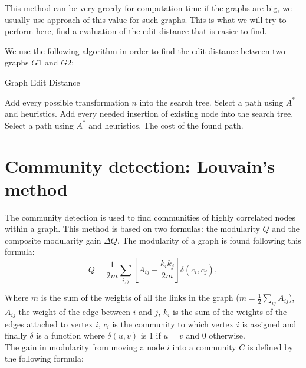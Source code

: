 \documentclass[UTF8, twoside]{EPURapport}
\begin{document}
	This method can be very greedy for computation time if the graphs are big, we usually use approach of this value for such graphs. This is what we will try to perform here, find a evaluation of the edit distance that is easier to find.

	We use the following algorithm in order to find the edit distance between two graphs $G1$ and $G2$:
	
\begin{algorithm}
  \caption{Graph Edit Distance}
  \begin{algorithmic}[1]
      \Repeat
		  \State Add every possible transformation $n$ into the search tree.
		  \State Select a path using $A^*$ and heuristics.
		\EndFor
		  \State Add every needed insertion of existing node into the search tree.
		  \State Select a path using $A^*$ and heuristics.
		\EndFor
	  \State \Return The cost of the found path.
  \end{algorithmic}
\end{algorithm}

\chapter{Community detection: Louvain's method}

	\hspace{4ex}The community detection is used to find communities of highly correlated nodes within a graph. This method is based on two formulas: the modularity $Q$ and the composite modularity gain $\Delta Q$. The modularity of a graph is found following this formula:
\\

\[
Q = \frac{1}{2m}\underset{i,j}{\sum}\left[A_{ij} - \frac{k_ik_j}{2m}\right] \delta(c_i,c_j),
\]

	Where $m$ is the sum of the weights of all the links in the graph ($m = \frac{1}{2}\underset{ij}{\sum}A_{ij}$), $A_{ij}$ the weight of the edge between $i$ and $j$, $k_i$ is the sum of the weights of the edges attached to vertex $i$, $c_i$ is the community to which vertex $i$ is assigned and finally $\delta$ is a function where $\delta(u,v)$ is 1 if $u=v$ and 0 otherwise.
\\
	
	The gain in modularity from moving a node $i$ into a community $C$ is defined by the following formula:
\\
\end{document}
